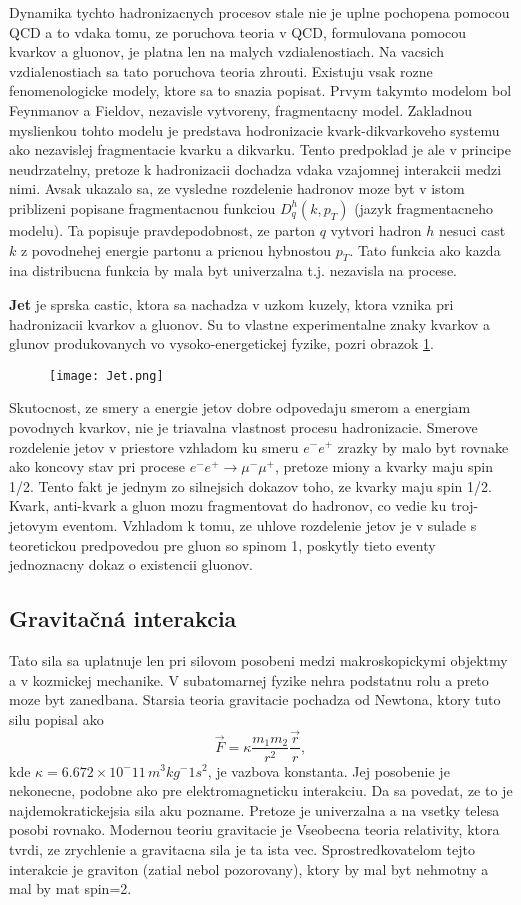 \documentclass[../../main.tex]{subfiles}
\begin{document}
Dynamika tychto hadronizacnych procesov stale nie je uplne pochopena pomocou QCD a to vdaka tomu, ze poruchova teoria v QCD, formulovana pomocou kvarkov a gluonov, je platna len na malych vzdialenostiach. Na vacsich vzdialenostiach sa tato poruchova teoria zhrouti. Existuju vsak rozne fenomenologicke modely, ktore sa to snazia popisat. Prvym takymto modelom bol Feynmanov a Fieldov, nezavisle vytvoreny, fragmentacny model. Zakladnou myslienkou tohto modelu je predstava hodronizacie kvark-dikvarkoveho systemu ako nezavislej fragmentacie kvarku a dikvarku. Tento predpoklad je ale v principe neudrzatelny, pretoze k hadronizacii dochadza vdaka vzajomnej interakcii medzi nimi. Avsak ukazalo sa, ze vysledne rozdelenie hadronov moze byt v istom priblizeni popisane fragmentacnou funkciou $D^h_q(k,p_T)$ (jazyk fragmentacneho modelu). Ta popisuje pravdepodobnost, ze parton $q$ vytvori hadron $h$ nesuci cast $k$ z povodnehej energie partonu a pricnou hybnostou $p_T$. Tato funkcia ako kazda ina distribucna funkcia by mala byt univerzalna t.j. nezavisla na procese. \par
\textbf{Jet} je sprska castic, ktora sa nachadza v uzkom kuzely, ktora vznika pri hadronizacii kvarkov a gluonov. Su to vlastne experimentalne znaky kvarkov a glunov produkovanych vo vysoko-energetickej fyzike, pozri obrazok \ref{sf1:fig:jet}. 
\begin{figure}[!h]
\centering
\texttt{[image: Jet.png]}
\caption{}
\label{sf1:fig:jet}
\end{figure}
Skutocnost, ze smery a energie jetov dobre odpovedaju smerom a energiam povodnych kvarkov, nie je triavalna vlastnost procesu hadronizacie. Smerove rozdelenie jetov v priestore vzhladom ku smeru $e^-e^+$ zrazky by malo byt rovnake ako koncovy stav pri procese $e^-e^+\rightarrow \mu^-\mu^+$, pretoze miony a kvarky maju spin 1/2. Tento fakt je jednym zo silnejsich dokazov toho, ze kvarky maju spin 1/2. Kvark, anti-kvark a gluon mozu fragmentovat do hadronov, co vedie ku troj-jetovym eventom. Vzhladom k tomu, ze uhlove rozdelenie jetov je v sulade s teoretickou predpovedou pre gluon so spinom 1, poskytly tieto eventy jednoznacny dokaz o existencii gluonov.
\subsection{Gravitačná interakcia}
Tato sila sa uplatnuje len pri silovom posobeni medzi makroskopickymi objektmy a v kozmickej mechanike. V subatomarnej fyzike nehra podstatnu rolu a preto moze byt zanedbana. Starsia teoria gravitacie pochadza od Newtona, ktory tuto silu popisal ako $$ \vec{F}=\kappa\frac{m_1m_2}{r^2}\frac{\vec{r}}{r}, $$ kde $\kappa=6.672\times10^-11\,m^3kg^-1s^2$, je vazbova konstanta. Jej posobenie je nekonecne, podobne ako pre elektromagneticku interakciu. Da sa povedat, ze to je najdemokratickejsia sila aku pozname. Pretoze je univerzalna a na vsetky telesa posobi rovnako. Modernou teoriu gravitacie je Vseobecna teoria relativity, ktora tvrdi, ze zrychlenie a gravitacna sila je ta ista vec. Sprostredkovatelom tejto interakcie je graviton (zatial nebol pozorovany), ktory by mal byt nehmotny a mal by mat spin=2.
\end{document}
